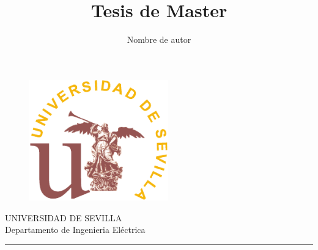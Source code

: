\documentclass[11pt,a4paper,twoside,titlepage]{book}
\author{Nombre de autor}
\title{Tesis de Master}
\begin{document}
 


\begin{titlepage}
		\vspace*{-2.5cm}
	\begin{figure}
		\centering
	 	 \includegraphics[width=6cm]{eps_us}\\
	\end{figure}
	\begin{center}
		\vspace*{1.5cm} {\large UNIVERSIDAD DE SEVILLA} \\[0.3cm] {\large
		Departamento de Ingenieria Eléctrica}
		\vspace*{0.5cm}
	
		\noindent \rule{\textwidth}{0.5pt}%
		\vspace*{0.5cm}
		{\Large \scshape
	
	
}
\end{center}
\end{titlepage}
\end{document}
